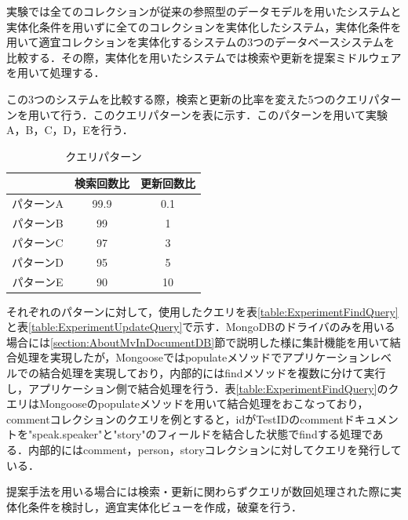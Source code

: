 \documentclass[a4paper,11pt]{ujreport}
\begin{document}
実験では全てのコレクションが従来の参照型のデータモデルを用いたシステムと実体化条件を用いずに全てのコレクションを実体化したシステム，実体化条件を用いて適宜コレクションを実体化するシステムの3つのデータベースシステムを比較する．その際，実体化を用いたシステムでは検索や更新を提案ミドルウェアを用いて処理する．

この3つのシステムを比較する際，検索と更新の比率を変えた5つのクエリパターンを用いて行う．このクエリパターンを表に示す．このパターンを用いて実験A，B，C，D，Eを行う．
\begin{table}[htb]
  \begin{center}
    \caption{クエリパターン}
		\label{table:experiment_query_pattern}
    \begin{tabular}{|c|c|c|} \hline
        & 検索回数比 & 更新回数比 \\ \hline
      パターンA & 99.9 & 0.1\\ \hline
      パターンB & 99 & 1\\ \hline
      パターンC & 97 & 3\\ \hline
			パターンD & 95 & 5\\ \hline
      パターンE & 90 & 10\\ \hline
    \end{tabular}
  \end{center}
\end{table}
それぞれのパターンに対して，使用したクエリを表\ref{table:ExperimentFindQuery}と表\ref{table:ExperimentUpdateQuery}で示す．MongoDBのドライバのみを用いる場合には\ref{section:AboutMvInDocumentDB}節で説明した様に集計機能を用いて結合処理を実現したが，Mongooseではpopulateメソッドでアプリケーションレベルでの結合処理を実現しており，内部的にはfindメソッドを複数に分けて実行し，アプリケーション側で結合処理を行う．表\ref{table:ExperimentFindQuery}のクエリはMongooseのpopulateメソッドを用いて結合処理をおこなっており，commentコレクションのクエリを例とすると，idがTestIDのcommentドキュメントを"speak.speaker"と"story"のフィールドを結合した状態でfindする処理である．内部的にはcomment，person，storyコレクションに対してクエリを発行している．

提案手法を用いる場合には検索・更新に関わらずクエリが数回処理された際に実体化条件を検討し，適宜実体化ビューを作成，破棄を行う．
\end{document}
